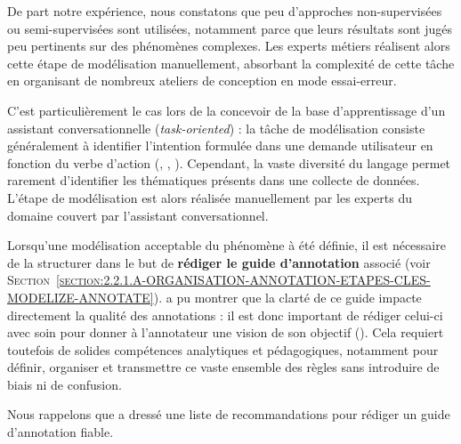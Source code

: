			\begin{leftBarAuthorOpinion}
				De part notre expérience, nous constatons que peu d'approches non-supervisées ou semi-supervisées sont utilisées, notamment parce que leurs résultats sont jugés peu pertinents sur des phénomènes complexes.
				Les experts métiers réalisent alors cette étape de modélisation manuellement, absorbant la complexité de cette tâche en organisant de nombreux ateliers de conception en mode essai-erreur.
				
				C'est particulièrement le cas lors de la concevoir de la base d'apprentissage d'un assistant conversationnelle (\textit{task-oriented}) : la tâche de modélisation consiste généralement à identifier l'intention formulée dans une demande utilisateur en fonction du verbe d'action (, , ).
				Cependant, la vaste diversité du langage permet rarement d'identifier les thématiques présents dans une collecte de données.
				L'étape de modélisation est alors réalisée manuellement par les experts du domaine couvert par l'assistant conversationnel.
			\end{leftBarAuthorOpinion}
			
			Lorsqu'une modélisation acceptable du phénomène à été définie, il est nécessaire de la structurer dans le but de \textbf{rédiger le guide d'annotation} associé (voir \textsc{Section~\ref{section:2.2.1.A-ORGANISATION-ANNOTATION-ETAPES-CLES-MODELIZE-ANNOTATE}}).
			\cite{nedellec-etal:2006:annotation-guidelines-machine} a pu montrer que la clarté de ce guide impacte directement la qualité des annotations : il est donc important de rédiger celui-ci avec soin pour donner à l'annotateur une vision de son objectif (\cite{fort-etal:2009:vers-methodologie-annotation}).
			Cela requiert toutefois de solides compétences analytiques et pédagogiques, notamment pour définir, organiser et transmettre ce vaste ensemble des règles sans introduire de biais ni de confusion.
			\begin{leftBarInformation}
				Nous rappelons que \cite{dipper-etal:2004:useradaptive-annotation-guidelines} a dressé une liste de recommandations pour rédiger un guide d'annotation fiable.
			\end{leftBarInformation}
			

